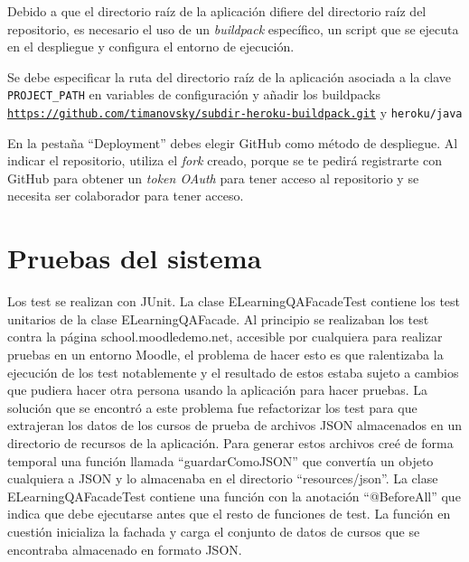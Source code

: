 Debido a que el directorio raíz de la aplicación difiere del directorio raíz del repositorio, es necesario el uso de un \textit{buildpack} específico, un script que se ejecuta en el despliegue y configura el entorno de ejecución.

Se debe especificar la ruta del directorio raíz de la aplicación asociada a la clave \texttt{PROJECT\_PATH} en variables de configuración y añadir los buildpacks \texttt{\url{https://github.com/timanovsky/subdir-heroku-buildpack.git}} y \texttt{heroku/java}

En la pestaña ``Deployment'' debes elegir GitHub como método de despliegue. Al indicar el repositorio, utiliza el \textit{fork} creado, porque se te pedirá registrarte con GitHub para obtener un \textit{token OAuth} para tener acceso al repositorio y se necesita ser colaborador para tener acceso.


\section{Pruebas del sistema}
Los test se realizan con JUnit.
La clase ELearningQAFacadeTest contiene los test unitarios de la clase ELearningQAFacade. Al principio se realizaban los test contra la página school.moodledemo.net, accesible por cualquiera para realizar pruebas en un entorno Moodle, el problema de hacer esto es que ralentizaba la ejecución de los test notablemente y el resultado de estos estaba sujeto a cambios que pudiera hacer otra persona usando la aplicación para hacer pruebas.
La solución que se encontró a este problema fue refactorizar los test para que extrajeran los datos de los cursos de prueba de archivos JSON almacenados en un directorio de recursos de la aplicación. Para generar estos archivos creé de forma temporal una función llamada ``guardarComoJSON'' que convertía un objeto cualquiera a JSON y lo almacenaba en el directorio ``resources/json''.
La clase ELearningQAFacadeTest contiene una función con la anotación ``@BeforeAll'' que indica que debe ejecutarse antes que el resto de funciones de test. La función en cuestión inicializa la fachada y carga el conjunto de datos de cursos que se encontraba almacenado en formato JSON.